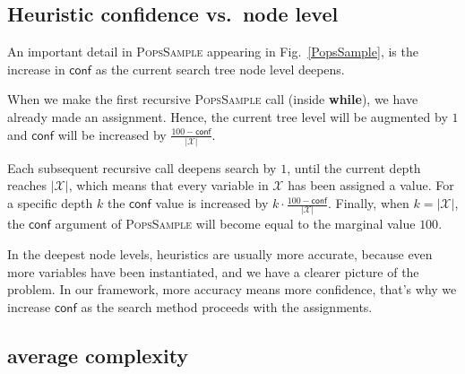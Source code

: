 \documentclass{ws-ijait}
\begin{document}
\subsection{Heuristic confidence vs.\ node level}

An important detail in \textsc{PopsSample} appearing in
Fig.~\ref{PopsSample}, is the increase in $\mathsf{conf}$ as
the current search tree node level deepens.

When we make the first recursive \textsc{PopsSample} call
(inside \textbf{while}), we have already made an assignment.
Hence, the current tree level will be augmented by $1$ and
$\mathsf{conf}$ will be increased by $\frac{100 -
\mathsf{conf}}{|\mathscr{X}|}$.

Each subsequent recursive call deepens search by $1$, until
the current depth reaches $|\mathscr{X}|$, which means that
every variable in $\mathscr{X}$ has been assigned a value.
For a specific depth $k$ the $\mathsf{conf}$ value is
increased by $k \cdot \frac{100 -
\mathsf{conf}}{|\mathscr{X}|}$. Finally, when $k =
|\mathscr{X}|$, the $\mathsf{conf}$ argument of
\textsc{PopsSample} will become equal to the marginal value
$100$.

In the deepest node levels, heuristics are usually more
accurate, because even more variables have been
instantiated, and we have a clearer picture of the problem.
In our framework, more accuracy means more confidence,
that's why we increase $\mathsf{conf}$ as the search method
proceeds with the assignments.

\subsection{\PopsSample{} average complexity}
\end{document}

